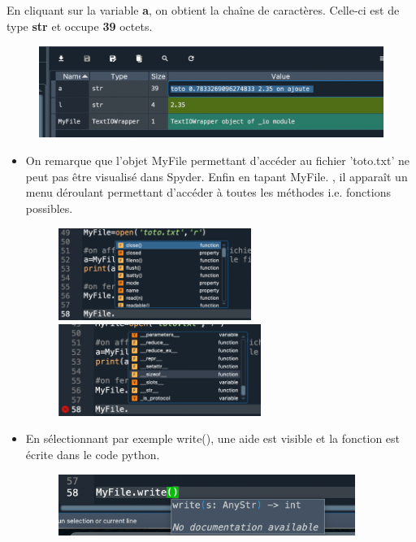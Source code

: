\documentclass[a4paper,12pt]{article}
\begin{document}
En cliquant sur la variable \textbf{a}, on obtient la cha\^ine de caract\`eres. Celle-ci est de type \textbf{str} et occupe \textbf{39} octets.
\begin{figure}[h]
\begin{center}
\includegraphics[height=3cm]{./png/fichier-chaine.png}
\end{center}
\end{figure}
\clearpage
\begin{itemize}
\item On remarque que l'objet MyFile permettant d'acc\'eder au fichier 'toto.txt' ne peut pas \^etre visualis\'e dans Spyder. Enfin en tapant MyFile. , il appara\^it un menu d\'eroulant permettant d'acc\'eder \`a toutes les m\'ethodes i.e. fonctions possibles. 
\begin{figure}[h]
\begin{center}
\includegraphics[height=3cm]{./png/fichier-methodes-a.png}\includegraphics[height=3cm]{./png/fichier-methodes-b.png}
\end{center}
\end{figure}
\item En s\'electionnant par exemple write(), une aide est visible et la fonction est \'ecrite dans le code python. 
\begin{figure}[h]
\begin{center}
\includegraphics[height=2cm]{./png/fichier-write.png}
\end{center}
\end{figure}
\end{itemize}
\end{document}
